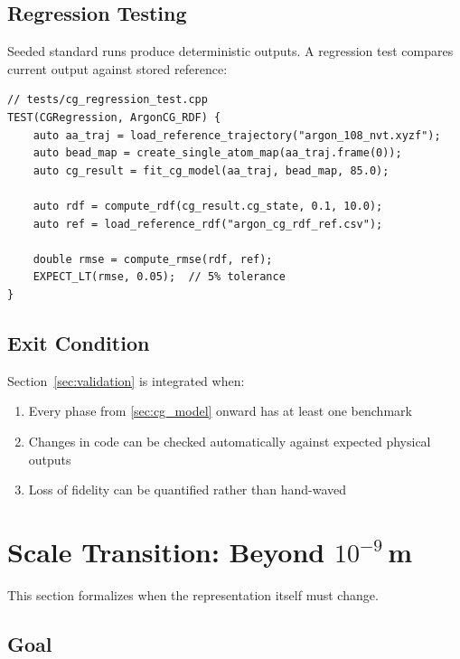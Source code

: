 \documentclass[11pt]{article}
\begin{document}
\subsection{Regression Testing}

Seeded standard runs produce deterministic outputs.  A regression test
compares current output against stored reference:

\begin{lstlisting}
// tests/cg_regression_test.cpp
TEST(CGRegression, ArgonCG_RDF) {
    auto aa_traj = load_reference_trajectory("argon_108_nvt.xyzf");
    auto bead_map = create_single_atom_map(aa_traj.frame(0));
    auto cg_result = fit_cg_model(aa_traj, bead_map, 85.0);

    auto rdf = compute_rdf(cg_result.cg_state, 0.1, 10.0);
    auto ref = load_reference_rdf("argon_cg_rdf_ref.csv");

    double rmse = compute_rmse(rdf, ref);
    EXPECT_LT(rmse, 0.05);  // 5% tolerance
}
\end{lstlisting}

\subsection{Exit Condition}

Section~\ref{sec:validation} is integrated when:
\begin{enumerate}
  \item Every phase from \ref{sec:cg_model} onward has at least one benchmark
  \item Changes in code can be checked automatically against expected
        physical outputs
  \item Loss of fidelity can be quantified rather than hand-waved
\end{enumerate}

\section{Scale Transition: Beyond $10^{-9}$\,m}
\label{sec:scale_transition}

This section formalizes when the representation itself must change.

\subsection{Goal}
\end{document}
